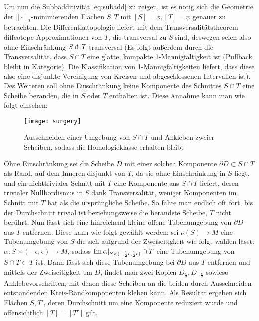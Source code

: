             Um nun die Subbadditivität \ref{eq:subadd} zu zeigen, ist es nötig sich die Geometrie der $||\cdot||_T$-minimierenden Flächen $S,T$ mit $[S]=\phi, [T]=\psi$ genauer zu betrachten. Die Differentialtopologie liefert mit dem Transversalitätstheorem diffeotope Approximationen von $T$, die transversal zu $S$ sind, deswegen seien also ohne Einschränkung $S \pitchfork T$ transversal (Es folgt außerdem durch die Transversalität, dass $S\cap T$ eine glatte, kompakte 1-Mannigfaltigkeit ist (Pullback bleibt in Kategorie). Die Klassifikation von 1-Mannigfaltigkeiten liefert, dass diese also eine disjunkte Vereinigung von Kreisen und abgeschlossenen Intervallen ist). Des Weiteren soll ohne Einschränkung keine Komponente des Schnittes $S\cap T$  eine Scheibe beranden, die in $S$ oder $T$ enthalten ist. Diese Annahme kann man wie folgt einsehen:\\
            \begin{wrapfigure}{r}{0.5\textwidth}
                \label{fig:surgery}
                \centering
                \texttt{[image: surgery]}
                \caption{Ausschneiden einer Umgebung von $S\cap T$ und Ankleben zweier Scheiben, sodass die Homologieklasse erhalten bleibt}
            \end{wrapfigure}
            Ohne Einschränkung sei die Scheibe $D$ mit einer solchen Komponente $\partial D \subset S \cap T$ als Rand, auf dem Inneren disjunkt von $T$, da sie ohne Einschränkung in $S$ liegt, und ein nichttrivialer Schnitt mit $T$ eine Komponente aus $S\cap T$ liefert, deren trivialer Nullbordismus in $S$ dank Transversalität, weniger Komponenten im Schnitt mit $T$ hat als die ursprüngliche Scheibe. So fahre man endlich oft fort, bis der Durchschnitt trivial ist beziehungsweise die berandete Scheibe, $T$ nicht berührt. Nun lässt sich eine hinreichend kleine offene Tubenumgebung von $\partial D$ aus $T$ entfernen. Diese kann wie folgt gewählt werden: sei $\nu(S) \to M$ eine Tubenumgebung von $S$ die sich aufgrund der Zweiseitigkeit wie folgt wählen lässt: $\alpha: S \times (-\epsilon,\epsilon) \to M$, sodass $\operatorname{Im}\alpha|_{S\times (-\frac 12\epsilon,\frac 12 \epsilon)} \cap T$ eine Tubenumgebung von $S\cap T \subset T$ ist. Dann lässt sich diese Tubenumgebung bei $\partial D$ aus $T$ entfernen und mittels der Zweiseitigkeit um $D$, findet man zwei Kopien $D_{\frac \epsilon 2}, D_{-\frac \epsilon 2}$ sowieso Anklebevorschriften, mit denen diese Scheiben an die beiden durch Ausschneiden entstandenden Kreis-Randkomponenten kleben kann. Als Resultat ergeben sich Flächen $S,T'$, deren Durchschnitt um eine Komponente reduziert wurde und offensichtlich $[T]=[T']$ gilt. \\
